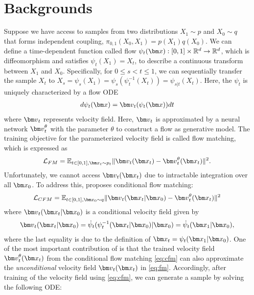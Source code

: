 \section{Backgrounds}
Suppose  we have access to samples from two distributions $X_1\sim p$ and $X_0\sim q$ that forms independent coupling, $\pi_{0,1}(X_0, X_1)=p(X_1)q(X_0)$. 
We can define a time-dependent function called flow $\psi_t(\vx) : [0,1]\times \mathbb{R}^d \rightarrow \mathbb{R}^d$, which is diffeomorphism and satisfies $\psi_t(X_1)=X_t$, to describe a continuous transform between $X_1$ and $X_0$.
Specifically, for $0\leq s < t \leq 1$, we can sequentially transfer the sample $X_t$ to $X_s = \psi_s(X_1)=\psi_s(\psi_t^{-1}(X_t))=\psi_{s|t}(X_t)$.
Here, the $\psi_t$ is uniquely characterized by a flow ODE
\begin{align}
    d\psi_t(\vx) = \vv_t(\psi_t(\vx))dt
    \label{eqn:flowode}
\end{align}
where $\vv_t$ represents velocity field.
Here, $\vv_t$ is approximated by a neural network $\vv_t^\theta$ with the parameter $\theta$ to construct a flow as generative model.
The training objective for the parameterized velocity field is called flow matching, which is expressed as
\begin{align}\label{eq:fm}
    \mathcal{L}_{FM} = \mathbb{E}_{t\in [0,1], \vx_t \sim p_t} \| \vv_t(\vx_t) - \vv_t^\theta(\vx_t) \|^2.
\end{align}
Unfortunately,  we cannot access $\vv_t(\vx_t)$ due to intractable integration over all $\vx_0$.
To address this, \cite{lipman2023flow} proposes conditional flow matching: 
\begin{align}\label{eq:cfm}
    \mathcal{L}_{CFM} = \mathbb{E}_{t\in [0,1], \vx_0 \sim q} \| \vv_t(\vx_t|\vx_0) - \vv_t^\theta(\vx_t) \|^2
\end{align}
where $\vv_t(\vx_t|\vx_0)$ is a conditional velocity field given by
\begin{align}\label{eq:condv}
    \vv_t(\vx_t|\vx_0) = 
    \dot\psi_t(\psi_t^{-1}(\vx_t|\vx_0)|\vx_0) =  \dot\psi_t(\vx_1 |\vx_0) ,
\end{align}
where the last equality is due to the definition of $\vx_t=\psi_t(\vx_1|\vx_0)$.
One of the most important contribution of \cite{lipman2023flow} is that the trained velocity field $\vv_t^\theta(\vx_t)$ from the conditional flow matching
\eqref{eq:cfm} can also approximate the {\em unconditional} velocity field $\vv_t(\vx_t)$ in \eqref{eq:fm}. Accordingly,
after training of the velocity field using \eqref{eq:cfm}, we can generate a sample by solving the following ODE:
